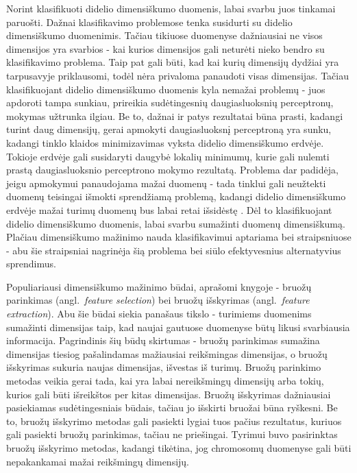\documentclass{VUMIFPSbakalaurinis}
\begin{document}
Norint klasifikuoti didelio dimensiškumo duomenis, labai svarbu juos tinkamai paruošti.
Dažnai klasifikavimo problemose tenka susidurti su didelio dimensiškumo duomenimis.
Tačiau tikiuose duomenyse dažniausiai ne visos dimensijos yra svarbios - kai kurios dimensijos gali neturėti nieko bendro su klasifikavimo problema.
Taip pat gali būti, kad kai kurių dimensijų dydžiai yra tarpusavyje priklausomi, todėl nėra privaloma panaudoti visas dimensijas.
Tačiau klasifikuojant didelio dimensiškumo duomenis kyla nemažai problemų - juos apdoroti tampa sunkiau, prireikia sudėtingesnių daugiasluoksnių perceptronų, mokymas užtrunka ilgiau.
Be to, dažnai ir patys rezultatai būna prasti, kadangi turint daug dimensijų, gerai apmokyti daugiasluoksnį perceptroną yra sunku, kadangi tinklo klaidos minimizavimas vyksta didelio dimensiškumo erdvėje.
Tokioje erdvėje gali susidaryti daugybė lokalių minimumų, kurie gali nulemti prastą daugiasluoksnio perceptrono mokymo rezultatą.
Problema dar padidėja, jeigu apmokymui panaudojama mažai duomenų - tada tinklui gali neužtekti duomenų teisingai išmokti sprendžiamą problemą, kadangi didelio dimensiškumo erdvėje mažai turimų duomenų bus labai retai išsidėstę \cite[2455~psl.]{spectra}.
Dėl to klasifikuojant didelio dimensiškumo duomenis, labai svarbu sumažinti duomenų dimensiškumą.
Plačiau dimensiškumo mažinimo nauda klasifikavimui aptariama \cite[2455~psl.]{spectra} bei \cite[296~psl.]{ann-feature-extraction} straipsniuose - abu šie straipsniai nagrinėja šią problema bei siūlo efektyvesnius alternatyvius sprendimus.

Populiariausi dimensiškumo mažinimo būdai, aprašomi \cite{feature-extraction} knygoje - bruožų parinkimas (angl.~\textit{feature selection}) bei bruožų išskyrimas (angl.~\textit{feature extraction}).
Abu šie būdai siekia panašaus tikslo - turimiems duomenims sumažinti dimensijas taip, kad naujai gautuose duomenyse būtų likusi svarbiausia informacija.
Pagrindinis šių būdų skirtumas - bruožų parinkimas sumažina dimensijas tiesiog pašalindamas mažiausiai reikšmingas dimensijas, o bruožų išskyrimas sukuria naujas dimensijas, išvestas iš turimų.
Bruožų parinkimo metodas veikia gerai tada, kai yra labai nereikšmingų dimensijų arba tokių, kurios gali būti išreikštos per kitas dimensijas.
Bruožų išskyrimas dažniausiai pasiekiamas sudėtingesniais būdais, tačiau jo išskirti bruožai būna ryškesni.
Be to, bruožų išskyrimo metodas gali pasiekti lygiai tuos pačius rezultatus, kuriuos gali pasiekti bruožų parinkimas, tačiau ne priešingai.
Tyrimui buvo pasirinktas bruožų išskyrimo metodas, kadangi tikėtina, jog chromosomų duomenyse gali būti nepakankamai mažai reikšmingų dimensijų.
\end{document}
